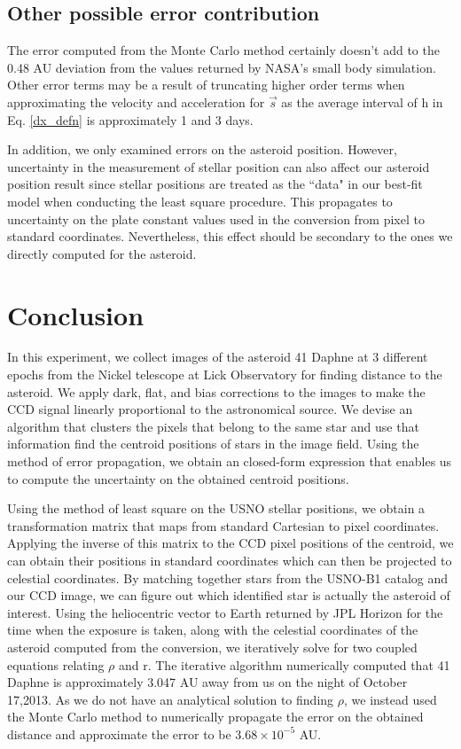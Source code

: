 \documentclass[authoryear, 12pt,5p, times]{elsarticle}
\begin{document}
\subsection{Other possible error contribution}
The error computed from the Monte Carlo method certainly doesn't add to the 0.48 AU deviation from the values returned by NASA's small body simulation. Other error terms may be a result of truncating  higher order terms when approximating the velocity and acceleration for $\vec{s}$ as the average interval of h in Eq. \ref{dx_defn} is approximately 1 and 3 days. 

In addition,  we only examined errors on the asteroid position. However, uncertainty in the measurement of stellar position can also affect our asteroid position result since stellar positions are treated as the ``data" in our best-fit model when conducting the least square procedure. This propagates to uncertainty on the plate constant values used in the conversion from pixel to standard coordinates. Nevertheless, this effect should be secondary to the ones we directly computed for the asteroid. 
\section{Conclusion}
In this experiment, we collect images of the asteroid 41 Daphne at 3 different epochs from the Nickel telescope at Lick Observatory for finding distance to the asteroid. We apply dark, flat, and bias corrections to the images to make the CCD signal linearly proportional to the astronomical source. We devise an algorithm that clusters the pixels that belong to the same star and use that information find the centroid positions of stars in the image field. Using the method of error propagation, we obtain an closed-form expression that enables us to compute the uncertainty on the obtained centroid positions. 

Using the method of least square on the USNO stellar positions, we obtain a transformation matrix that maps from standard Cartesian to pixel coordinates. Applying the inverse of this matrix to the CCD pixel positions of the centroid, we can obtain their positions in standard coordinates which can then be projected to celestial coordinates. By matching together stars from the USNO-B1 catalog and our CCD image, we can figure out which identified star is actually the asteroid of interest. Using the heliocentric vector to Earth returned by JPL Horizon for the time when the exposure is taken, along with the celestial coordinates of the asteroid computed from the conversion, we iteratively solve for two coupled equations relating $\rho$ and r. The iterative algorithm numerically computed that 41 Daphne is approximately 3.047 AU away from us on the night of October 17,2013. As we do not have an analytical solution to finding $\rho$, we instead used the Monte Carlo method to numerically propagate the error on the obtained distance and approximate the error to be $3.68\times10^{-5}$ AU.
\end{document}
